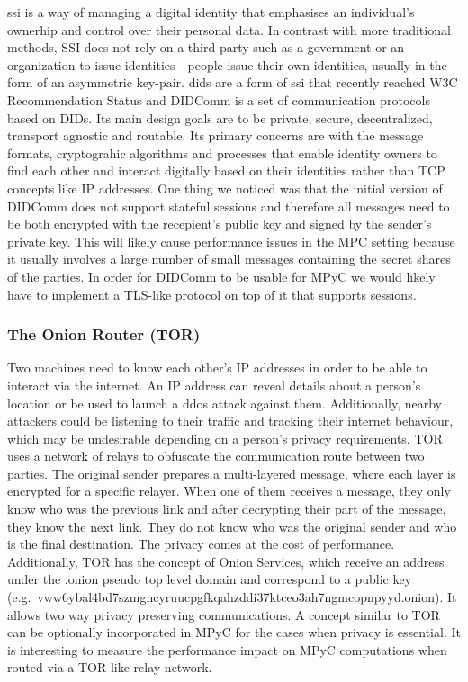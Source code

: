 \documentclass[
]{article}
\begin{document}
\gls{ssi} is a way of managing a digital identity that emphasises an
individual's ownerhip and control over their personal data. In contrast
with more traditional methods, SSI does not rely on a third party such
as a government or an organization to issue identities - people issue
their own identities, usually in the form of an asymmetric key-pair.
\glspl{did}\autocite{didW3C} are a form of \gls{ssi} that recently
reached W3C Recommendation Status and DIDComm\autocite{didcommSpec} is a
set of communication protocols based on DIDs. Its main design goals are
to be private, secure, decentralized, transport agnostic and routable.
Its primary concerns are with the message formats, cryptograhic
algorithms and processes that enable identity owners to find each other
and interact digitally based on their identities rather than TCP
concepts like IP addresses. One thing we noticed was that the initial
version of DIDComm does not support stateful sessions and therefore all
messages need to be both encrypted with the recepient's public key and
signed by the sender's private key. This will likely cause performance
issues in the MPC setting because it usually involves a large number of
small messages containing the secret shares of the parties. In order for
DIDComm to be usable for MPyC we would likely have to implement a
TLS-like protocol on top of it that supports sessions.

\hypertarget{the-onion-router-tor}{%
  \subsubsection{The Onion Router (TOR)}\label{the-onion-router-tor}}

Two machines need to know each other's IP addresses in order to be able
to interact via the internet. An IP address can reveal details about a
person's location or be used to launch a \gls{ddos} attack against them.
Additionally, nearby attackers could be listening to their traffic and
tracking their internet behaviour, which may be undesirable depending on
a person's privacy requirements. TOR uses a network of relays to
obfuscate the communication route between two parties. The original
sender prepares a multi-layered message, where each layer is encrypted
for a specific relayer. When one of them receives a message, they only
know who was the previous link and after decrypting their part of the
message, they know the next link. They do not know who was the original
sender and who is the final destination. The privacy comes at the cost
of performance. Additionally, TOR has the concept of Onion Services,
which receive an address under the .onion pseudo top level domain and
correspond to a public key
(e.g.~vww6ybal4bd7szmgncyruucpgfkqahzddi37ktceo3ah7ngmcopnpyyd.onion).
It allows two way privacy preserving communications. A concept similar
to TOR can be optionally incorporated in MPyC for the cases when privacy
is essential. It is interesting to measure the performance impact on
MPyC computations when routed via a TOR-like relay network.
\end{document}
